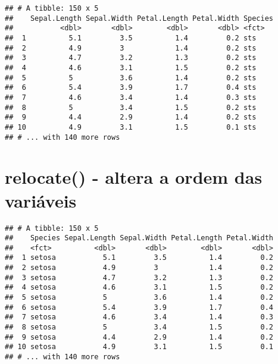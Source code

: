 \documentclass[]{book}
\newenvironment{Shaded}{\begin{snugshade}}{\end{snugshade}}
\newcommand{\DataTypeTok}[1]{\textcolor[rgb]{0.13,0.29,0.53}{#1}}
\newcommand{\KeywordTok}[1]{\textcolor[rgb]{0.13,0.29,0.53}{\textbf{#1}}}
\newcommand{\NormalTok}[1]{#1}
\newcommand{\OperatorTok}[1]{\textcolor[rgb]{0.81,0.36,0.00}{\textbf{#1}}}
\newcommand{\StringTok}[1]{\textcolor[rgb]{0.31,0.60,0.02}{#1}}
\begin{document}
\begin{verbatim}
## # A tibble: 150 x 5
##    Sepal.Length Sepal.Width Petal.Length Petal.Width Species
##           <dbl>       <dbl>        <dbl>       <dbl> <fct>  
##  1          5.1         3.5          1.4         0.2 sts    
##  2          4.9         3            1.4         0.2 sts    
##  3          4.7         3.2          1.3         0.2 sts    
##  4          4.6         3.1          1.5         0.2 sts    
##  5          5           3.6          1.4         0.2 sts    
##  6          5.4         3.9          1.7         0.4 sts    
##  7          4.6         3.4          1.4         0.3 sts    
##  8          5           3.4          1.5         0.2 sts    
##  9          4.4         2.9          1.4         0.2 sts    
## 10          4.9         3.1          1.5         0.1 sts    
## # ... with 140 more rows
\end{verbatim}

\hypertarget{relocate---altera-a-ordem-das-variuxe1veis}{%
\section{relocate() - altera a ordem das variáveis}\label{relocate---altera-a-ordem-das-variuxe1veis}}

\begin{Shaded}
\end{Shaded}

\begin{verbatim}
## # A tibble: 150 x 5
##    Species Sepal.Length Sepal.Width Petal.Length Petal.Width
##    <fct>          <dbl>       <dbl>        <dbl>       <dbl>
##  1 setosa           5.1         3.5          1.4         0.2
##  2 setosa           4.9         3            1.4         0.2
##  3 setosa           4.7         3.2          1.3         0.2
##  4 setosa           4.6         3.1          1.5         0.2
##  5 setosa           5           3.6          1.4         0.2
##  6 setosa           5.4         3.9          1.7         0.4
##  7 setosa           4.6         3.4          1.4         0.3
##  8 setosa           5           3.4          1.5         0.2
##  9 setosa           4.4         2.9          1.4         0.2
## 10 setosa           4.9         3.1          1.5         0.1
## # ... with 140 more rows
\end{verbatim}
\end{document}
